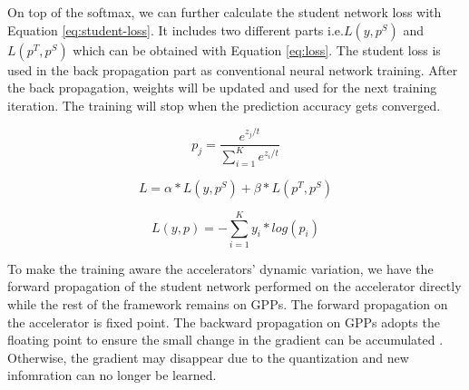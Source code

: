 On top of the softmax, we can further calculate the student 
network loss with Equation \ref{eq:student-loss}. It includes 
two different parts i.e.$L(y, p^S)$ and $L(p^T, p^S)$ which can be 
obtained with Equation \ref{eq:loss}. The student loss is used in the 
back propagation part as conventional neural network training. 
After the back propagation, weights will be updated and used for the 
next training iteration. The training will stop when the prediction 
accuracy gets converged.

\begin{equation}
	\label{eq:pt-calu}
p_j=\frac{e^{{z_j}/t}}{\sum_{i=1}^{K}e^{{z_i}/t}}
\end{equation}

\begin{equation}
	\label{eq:student-loss}
L=\alpha*L(y,p^S)+\beta*L(p^T,p^S)
\end{equation}

\begin{equation}
	\label{eq:loss}
L(y,p)=-\sum_{i=1}^{K}y_i*log(p_i)
\end{equation}


To make the training aware the accelerators' dynamic variation, 
we have the forward propagation of the student network 
performed on the accelerator directly while the rest of the 
framework remains on GPPs. The forward propagation on 
the accelerator is fixed point. The backward propagation on 
GPPs adopts the floating point to ensure 
the small change in the gradient can be accumulated \cite{Matthieu2014_8}. 
Otherwise, the gradient may disappear due to the 
quantization and new infomration can no longer be learned.

